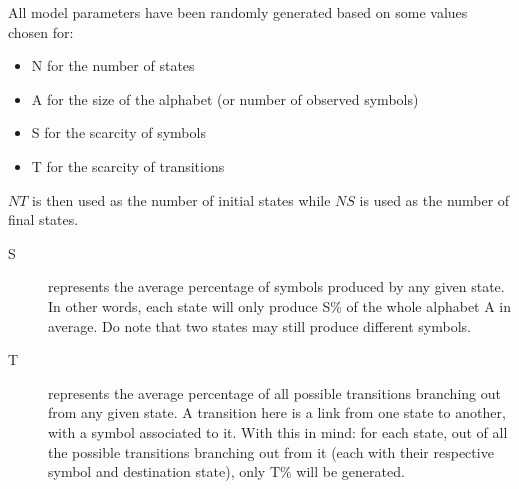 All model parameters have been randomly generated based on some values chosen for:
\begin{itemize}
\item N for the number of states
\item A for the size of the alphabet (or number of observed symbols)
\item S for the scarcity of symbols
\item T for the scarcity of transitions\end{itemize}

$NT$ is then used as the number of initial states while $NS$ is used as the number of final states.

\begin{description}
\item [{S}] represents the average percentage of symbols produced by any
given state. In other words, each state will only produce S\% of the
whole alphabet A in average. Do note that two states may still produce
different symbols.
\item [{T}] represents the average percentage of all possible transitions
branching out from any given state. A transition here is a link from
one state to another, with a symbol associated to it. With this in
mind: for each state, out of all the possible transitions branching
out from it (each with their respective symbol and destination state),
only T\% will be generated.
\end{description}



